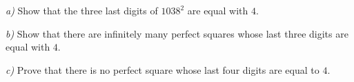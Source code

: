 \textit{a)} Show that the three last digits of $ 1038^2 $ are equal with $ 4. $

\textit{b)} Show that there are infinitely many perfect squares whose last three digits are equal with $ 4. $

\textit{c)} Prove that there is no perfect square whose last four digits are equal to $ 4. $